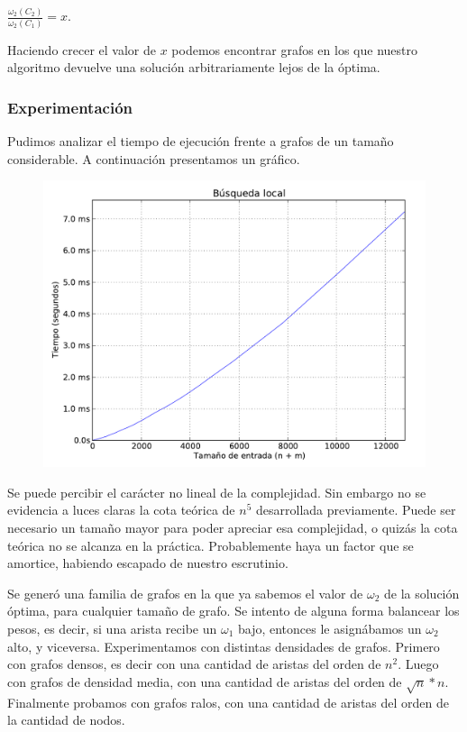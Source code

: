 $\frac{\omega_2(C_2)}{\omega_2(C_1)} = x$.

Haciendo crecer el valor de $x$ podemos encontrar grafos en los que nuestro algoritmo devuelve una
solución arbitrariamente lejos de la óptima.

\newpage
\subsubsection{Experimentación}

Pudimos analizar el tiempo de ejecución frente a grafos de un tamaño considerable. A continuación presentamos un gráfico.

\begin{figure}[H]
\begin{center}
\includegraphics[angle=0, scale=.75]{imagenes/local_search_time.pdf}
\label{grafico local}
\end{center}
\end{figure}


Se puede percibir el carácter no lineal de la complejidad. Sin embargo no se evidencia a luces claras la cota teórica de $n^5$ desarrollada
previamente. Puede ser necesario un tamaño mayor para poder apreciar esa complejidad, o quizás la cota teórica no se alcanza en la práctica.
Probablemente haya un factor que se amortice, habiendo escapado de nuestro escrutinio.

Se generó una familia de grafos en la que ya sabemos el valor de $\omega_2$ de la solución óptima, para cualquier tamaño de grafo. Se intento
de alguna forma balancear los pesos, es decir, si una arista recibe un $\omega_1$ bajo, entonces le asignábamos un $\omega_2$ alto, y viceversa.
Experimentamos con distintas densidades de grafos. Primero con grafos densos, es decir con una cantidad de aristas del orden de $n^2$. Luego con
grafos de densidad media, con una cantidad de aristas del orden de $\sqrt{n}*n$. Finalmente probamos con grafos ralos, con una cantidad de aristas
del orden de la cantidad de nodos.

